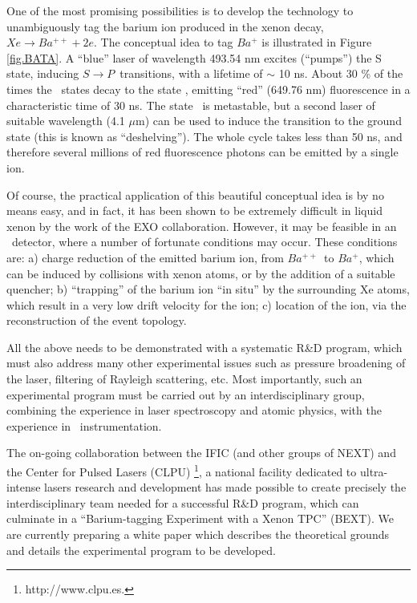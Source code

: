 One of the most promising possibilities is to develop the technology to unambiguously tag the barium ion produced in the xenon decay, $Xe \rightarrow Ba^{++} + 2 e$. The conceptual idea to tag $Ba^{+}$ is illustrated in Figure \ref{fig.BATA}. A ``blue'' laser of wavelength 493.54 nm excites (``pumps'') the S state, inducing $S \rightarrow P$~transitions, with a lifetime of $\sim$ 10 ns. About 30 \% of the times the \TwoP\ states decay to the state \TwoD, emitting ``red'' (649.76 nm) fluorescence in a characteristic time of 30 ns. The state \TwoD\ is metastable, but a second laser of suitable wavelength (4.1 $\mu$m) can be used to induce the transition to the ground state (this is known as ``deshelving'').  The whole cycle takes less than 50 ns, and therefore several millions of red fluorescence photons can be emitted by a single ion. 

Of course, the practical application of this beautiful conceptual idea is by no means easy, and in fact, it has been shown to be extremely difficult in liquid xenon by the work of the EXO collaboration. However, it may be feasible in an \HPXE\ detector, where a number of fortunate conditions may occur. These conditions are: a) charge reduction of the emitted barium ion, from $Ba^{++}$~to $Ba^{+}$, which can be induced by collisions with xenon atoms, or by the addition of a suitable quencher; b) ``trapping'' of the barium ion ``in situ'' by the surrounding Xe atoms, which result in a very low drift velocity for the ion; c) location of the ion, via the reconstruction of the event topology. 

All the above needs to be demonstrated with a systematic R\&D program, which must also address many other experimental issues such as pressure broadening of the laser, filtering of Rayleigh scattering, etc. Most importantly, such an experimental program must be carried out by an interdisciplinary group, combining the experience in laser spectroscopy and atomic physics, with the experience in \HPXE\ instrumentation.

The on-going collaboration between the IFIC (and other groups of NEXT) and the Center for Pulsed Lasers (CLPU) \footnote{http://www.clpu.es.}, a national facility dedicated to ultra-intense lasers research and development has made possible to create precisely the interdisciplinary team needed for a successful R\&D program, which can culminate in a ``Barium-tagging Experiment with a Xenon TPC'' (BEXT). We are currently preparing a white paper which describes the theoretical grounds and details the experimental program to be developed. 

